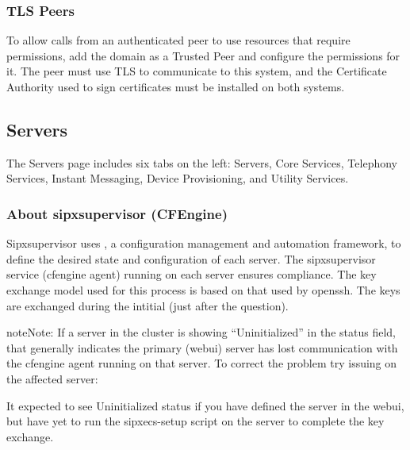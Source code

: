 \documentclass[letterpaper,10pt,english]{sphinxmanual}
\begin{document}
\subsubsection{TLS Peers}
\label{\detokenize{webui:tls-peers}}
To allow calls from an authenticated peer to use resources that require permissions, add the domain as a Trusted Peer and configure the permissions for it.
The peer must use TLS to communicate to this system, and the Certificate Authority used to sign certificates must be installed on both systems.


\subsection{Servers}
\label{\detokenize{webui:servers}}\label{\detokenize{webui:servers-tab}}
The Servers page includes six tabs on the left: Servers, Core Services, Telephony Services, Instant Messaging, Device Provisioning, and Utility Services.


\subsubsection{About sipxsupervisor (CFEngine)}
\label{\detokenize{webui:about-sipxsupervisor-cfengine}}
Sipxsupervisor uses , a configuration management and automation framework, to define the desired state and configuration of each server.
The sipxsupervisor service (cfengine agent) running on each server ensures compliance.
The key exchange model used for this process is based on that used by openssh. The keys are exchanged during the intitial {\hyperref[\detokenize{setupscript:id1}]{}} (just after the  question).

\begin{sphinxadmonition}{note}{Note:}
If a server in the cluster is showing “Uninitialized” in the status field, that generally indicates the primary (webui) server has lost communication with the cfengine agent running on that server.
To correct the problem try issuing on the affected server:

\begin{sphinxVerbatim}[commandchars=\\\{\}]
  
\end{sphinxVerbatim}

It expected to see Uninitialized status if you have defined the server in the webui, but have yet to run the sipxecs-setup script on the server to complete the key exchange.
\end{sphinxadmonition}
\end{document}
